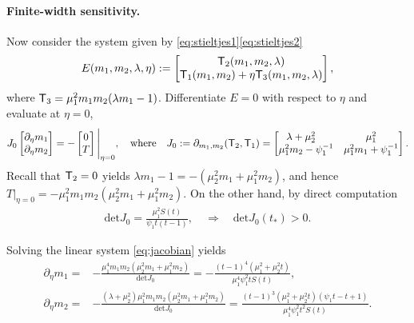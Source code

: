 \paragraph{Finite-width sensitivity.}
Now consider the system given by \eqref{eq:stieltjes1}\eqref{eq:stieltjes2}
\[
E(m_1,m_2,\lambda,\eta) := \begin{bmatrix}
    {\mathsf T}_2(m_1,m_2,\lambda) \\ {\mathsf T}_1(m_1,m_2) + \eta {\mathsf T}_3(m_1,m_2,\lambda)
\end{bmatrix},
\]
where ${\mathsf T}_3 = \mu_1^2m_1m_2(\lambda m_1-1)$. Differentiate $E=0$ with respect to $\eta$ and evaluate at $\eta=0$,
\begin{align}
J_0\begin{bmatrix}
    \partial_{\eta} m_1 \\ \partial_{\eta} m_2
\end{bmatrix}
= - \begin{bmatrix}
    0 \\ T
\end{bmatrix} \Bigg|_{\eta=0}, \quad \text{where} \quad
J_0 := \partial_{m_1,m_2}({\mathsf T}_2,{\mathsf T}_1) = \begin{bmatrix}
    \lambda+\mu_2^2\quad &\mu_1^2 \\ \mu_1^2m_2-\psi_1^{-1}  &\mu_1^2m_1+\psi_1^{-1}
\end{bmatrix}. \label{eq:jacobian}
\end{align}
Recall that ${\mathsf T}_2=0$ yields $\lambda m_1-1 = -(\mu_2^2m_1+\mu_1^2m_2)$, and hence $T|_{\eta=0} = -\mu_1^2m_1m_2(\mu_2^2m_1+\mu_1^2m_2)$. 
On the other hand, by direct computation
\begin{align}
\mathrm{det}J_0 = \frac{\mu_1^2S(t)}{\psi_1 t(t-1)}, \quad \Rightarrow \quad
\mathrm{det}J_0(t_*)>0.
\label{eq:jacobian-invertibility}
\end{align}

Solving the linear system \eqref{eq:jacobian} yields
\begin{align*}
    \partial_\eta m_1 =& -\frac{\mu_1^4 m_1m_2(\mu_2^2m_1+\mu_1^2m_2)}{\mathrm{det} J_0} = -\frac{(t-1)^4(\mu_1^2+\mu_2^2t)}{\mu_1^4\psi_1^2 t S(t)}, \\
    \partial_\eta m_2 =& -\frac{(\lambda+\mu_2^2)\mu_1^2m_1m_2(\mu_2^2m_1+\mu_1^2m_2)}{\mathrm{det} J_0} = \frac{(t-1)^3(\mu_1^2+\mu_2^2t)(\psi_1t-t+1)}{\mu_1^4\psi_1^2t^2 S(t)}. 
\end{align*}

